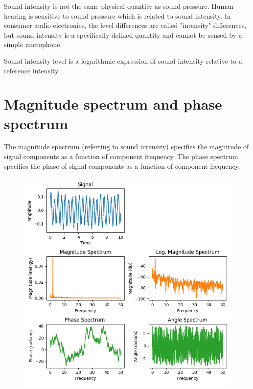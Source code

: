 \documentclass[journal,compsoc]{IEEEtran}
\begin{document}
Sound intensity is not the same physical quantity as sound pressure. Human hearing is sensitive to sound pressure which is related to sound intensity. In consumer audio electronics, the level differences are called "intensity" differences, but sound intensity is a specifically defined quantity and cannot be sensed by a simple microphone.

Sound intensity level is a logarithmic expression of sound intensity relative to a reference intensity.

\section{Magnitude spectrum and phase spectrum}
The magnitude spectrum (referring to sound intensity) specifies the magnitude of signal components as a function of component frequency. The phase spectrum specifies the phase of signal components as a function of component frequency. 

\begin{figure}[H]
\begin{center}
\includegraphics[scale=0.5]{magnitude_phase_spectra}
\end{center}
\end{figure}
\end{document}
